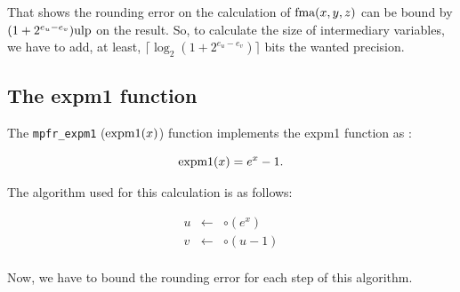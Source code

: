\documentclass[12pt]{amsart}
\def\n{\textnormal}
\def\ulp{{\rm ulp}}
\begin{document}
That shows the rounding error on the calculation of $\n{fma}(x,y,z)$ can be
bound by $(1+2^{e_u-e_v}) \ulp$ on the result. So, to calculate the size of
intermediary variables, we have to add, at least, $\lceil \log_2 (1+2^{e_u-e_v})\rceil$ bits the wanted precision.

\subsection{The expm1 function}

The {\tt mpfr\_expm1} ($\n{expm1}(x)$) function implements the expm1 function  as :

\[
\textnormal{expm1} (x) = e^x -1.
\]

The algorithm used for this calculation is as follows:

\begin{eqnarray}\nonumber
u&\leftarrow&\circ(e^x)\\\nonumber
v&\leftarrow&\circ(u-1)\\\nonumber
\end{eqnarray}

Now, we have to bound the rounding error for each step of this
algorithm.
\end{document}
